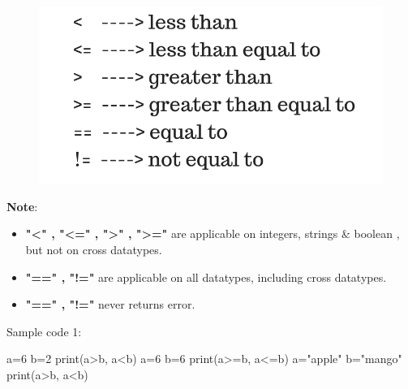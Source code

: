 \setlength{\columnsep}{3pt}
\begin{flushleft}
	\bigskip
	\begin{figure}[h!]
		\centering
		\includegraphics[scale=0.5]{content/chapter3/images/relational.png}
	\end{figure}

	\begin{tcolorbox}[breakable,notitle,boxrule=1pt,colback=yellow,colframe=yellow]
		\color{black}
		\font=8pt
		\textbf{Note}: 
		\begin{itemize}
			\item \textbf{"<" , "<=" , ">" , ">="} are applicable on integers, strings \& boolean , but not on cross datatypes.	
			\item \textbf{"==" , "!="} are applicable on all datatypes, including cross datatypes.
			\item \textbf{"==" , "!="} never returns error.
		\end{itemize}
		\font=4pt
	\end{tcolorbox}
	
	\newpage

	Sample code 1:
	\begin{tcolorbox}[breakable,notitle,boxrule=-0pt,colback=code,colframe=code]
			\color{white}
			\font=8pt
			a=6 \newline
			b=2 \newline
			print(a>b, a<b) \newline
			a=6 \newline
			b=6 \newline
			print(a>=b, a<=b) \newline
			a="apple" \newline
			b="mango" \newline
			print(a>b, a<b)
			\font=4pt
	\end{tcolorbox}
		

\end{flushleft}
